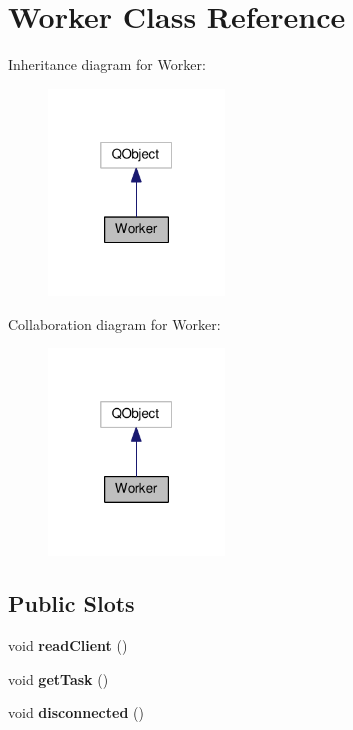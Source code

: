 \hypertarget{classWorker}{}\section{Worker Class Reference}
\label{classWorker}


Inheritance diagram for Worker\+:
\nopagebreak
\begin{figure}[H]
\begin{center}
\leavevmode
\includegraphics[width=133pt]{classWorker__inherit__graph}
\end{center}
\end{figure}


Collaboration diagram for Worker\+:
\nopagebreak
\begin{figure}[H]
\begin{center}
\leavevmode
\includegraphics[width=133pt]{classWorker__coll__graph}
\end{center}
\end{figure}
\subsection*{Public Slots}
\begin{DoxyCompactItemize}
\item 
\mbox{\label{classWorker_acc404e567293928e2af696bf2ea70999}} 
void {\bfseries read\+Client} ()
\item 
\mbox{\label{classWorker_a0917b71f0412691dcab437af6fedb8e6}} 
void {\bfseries get\+Task} ()
\item 
\mbox{\label{classWorker_a7c7a418a001835a9ac760b20bd0037ae}} 
void {\bfseries disconnected} ()
\end{DoxyCompactItemize}
